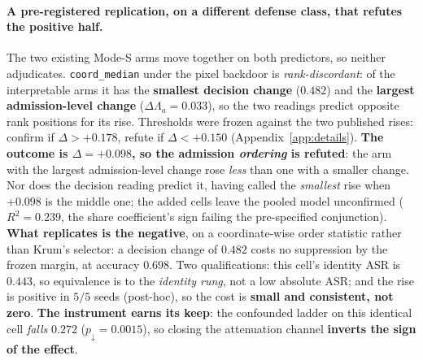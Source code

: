 \documentclass{article}
\begin{document}
\paragraph{A pre-registered replication, on a different defense class, that refutes the positive half.} The two existing Mode-S arms move together on both predictors, so neither adjudicates. \texttt{coord\_median} under the pixel backdoor is \emph{rank-discordant}: of the interpretable arms it has the \textbf{smallest decision change} ($0.482$) and the \textbf{largest admission-level change} ($\Delta\Lambda_a{=}0.033$), so the two readings predict opposite rank positions for its rise. Thresholds were frozen against the two published rises: confirm if $\Delta > +0.178$, refute if $\Delta < +0.150$ (Appendix~\ref{app:details}). \textbf{The outcome is $\Delta = +0.098$, so the admission \emph{ordering} is refuted}: the arm with the largest admission-level change rose \emph{less} than one with a smaller change. Nor does the decision reading predict it, having called the \emph{smallest} rise when $+0.098$ is the middle one; the added cells leave the pooled model unconfirmed ($R^2{=}0.239$, the share coefficient's sign failing the pre-specified conjunction). \textbf{What replicates is the negative}, on a coordinate-wise order statistic rather than Krum's selector: a decision change of $0.482$ costs no suppression by the frozen margin, at accuracy $0.698$. Two qualifications: this cell's identity ASR is $0.443$, so equivalence is to the \emph{identity rung}, not a low absolute ASR; and the rise is positive in $5/5$ seeds (post-hoc), so the cost is \textbf{small and consistent, not zero}. \textbf{The instrument earns its keep}: the confounded ladder on this identical cell \emph{falls} $0.272$ ($p_{\downarrow}{=}0.0015$), so closing the attenuation channel \textbf{inverts the sign of the effect}.
\end{document}
